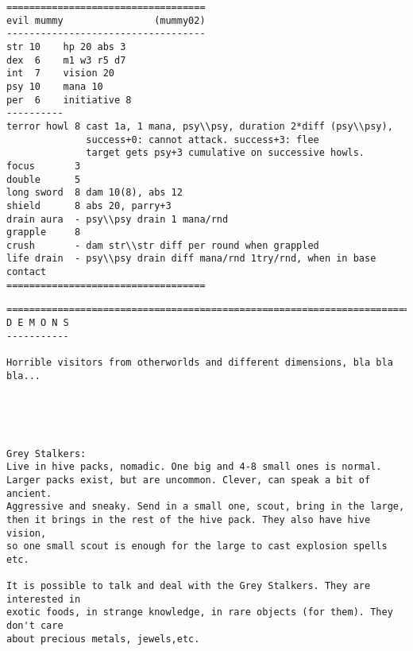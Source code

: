 \goodbreak \begin{samepage} \small \begin{verbatim}
===================================
evil mummy                (mummy02)
-----------------------------------
str 10    hp 20 abs 3
dex  6    m1 w3 r5 d7
int  7    vision 20
psy 10    mana 10
per  6    initiative 8
----------
terror howl 8 cast 1a, 1 mana, psy\\psy, duration 2*diff (psy\\psy),
              success+0: cannot attack. success+3: flee
              target gets psy+3 cumulative on successive howls.
focus       3
double      5
long sword  8 dam 10(8), abs 12
shield      8 abs 20, parry+3
drain aura  - psy\\psy drain 1 mana/rnd
grapple     8
crush       - dam str\\str diff per round when grappled
life drain  - psy\\psy drain diff mana/rnd 1try/rnd, when in base contact
===================================
\end{verbatim} \normalsize \end{samepage}








\clearpage
{}


\goodbreak \begin{samepage} \small \begin{verbatim}
================================================================================
D E M O N S
-----------

Horrible visitors from otherworlds and different dimensions, bla bla bla...
\end{verbatim} \normalsize \end{samepage}

\

\

\goodbreak \begin{samepage} \small \begin{verbatim}
Grey Stalkers:
Live in hive packs, nomadic. One big and 4-8 small ones is normal.
Larger packs exist, but are uncommon. Clever, can speak a bit of ancient.
Aggressive and sneaky. Send in a small one, scout, bring in the large,
then it brings in the rest of the hive pack. They also have hive vision,
so one small scout is enough for the large to cast explosion spells etc.

It is possible to talk and deal with the Grey Stalkers. They are interested in
exotic foods, in strange knowledge, in rare objects (for them). They don't care
about precious metals, jewels,etc.
\end{verbatim} \normalsize \end{samepage}

